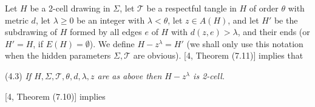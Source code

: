 Let $H$ be a 2-cell drawing in $\Sigma$, let $\mathcal{T}$ be a respectful tangle in $H$ of order $\theta$ with metric $d$, let $\lambda \ge 0$ be an integer with $\lambda < \theta$, let $z \in A(H)$, and let $H'$ be the subdrawing of $H$ formed by all edges $e$ of $H$ with $d(z, e) > \lambda$, and their ends (or $H' = H$, if $E(H) = \emptyset$). We define $H - z^\lambda = H'$ (we shall only use this notation when the hidden parameters $\Sigma, \mathcal{T}$ are obvious). [4, Theorem (7.11)] implies that

\stmt
(4.3) \textit{If $H, \Sigma, \mathcal{T}, \theta, d, \lambda, z$ are as above then $H - z^\lambda$ is 2-cell.}

[4, Theorem (7.10)] implies
